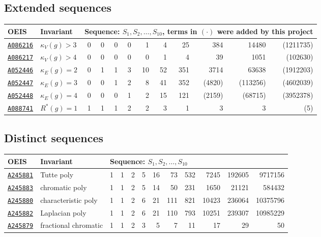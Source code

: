 \documentclass[12pt]{article}
\newcommand{\OEIS}[1]
{\href{https://oeis.org/#1}{\texttt{#1}}}
\newcommand{\SEQ}{S}
\newcommand{\VARedgeconnectivity}{\kappa_{E}(g)}
\newcommand{\VARvertexconnectivity}{\kappa_{V}(g)}
\newcommand{\VARstronglyregular}{R^*}
\begin{document}
\begin{appendices}
\newenvironment{invariantTable}[2]
{
  \begin{longtable}{@{\extracolsep{\fill}} #1}
    \toprule
    OEIS & Invariant & #2 \\
    \midrule\bottomrule
}
{
  \end{longtable}
}

\subsection{Extended sequences}
\label{sec:seq_extended}

\begin{invariantTable}{l l r r r r r r r r r r}
{\multicolumn{10}{l}{Sequence: $\SEQ_1, \SEQ_2, \ldots, \SEQ_{10}$, terms in $(\cdot)$ were added by this project}}
\OEIS{A086216} & $\VARvertexconnectivity > 3$ & 0 & 0 & 0 & 0 & 1 & 4 & 25 & 384 & 14480 & (1211735) \\
\OEIS{A086217} & $\VARvertexconnectivity > 4$ & 0 & 0 & 0 & 0 & 0 & 1 & 4 & 39 & 1051 & (102630) \\
\OEIS{A052446} & $\VARedgeconnectivity =2$ & 	0& 1& 1& 3& 10& 52& 351& 3714& 63638& (1912203) \\
\OEIS{A052447} & $\VARedgeconnectivity =3$ & 0& 0& 1& 2& 8& 41& 352& (4820) & (113256) & (4602039) \\
\OEIS{A052448} & $\VARedgeconnectivity =4$ & 	0& 0& 0& 1& 2& 15& 121& (2159) & (68715) & (3952378) \\
\OEIS{A088741} & $\VARstronglyregular(g)=1$ & 	1& 1& 1& 2& 2& 3& 1& 3& 3& (5) \\
\end{invariantTable}

\clearpage %

\subsection{Distinct sequences}
\label{sec:seq_distinct}

\begin{invariantTable}{l l r r r r r r r r r r}
{\multicolumn{10}{l}{Sequence: $\SEQ_1, \SEQ_2, \ldots, \SEQ_{10}$}}
\OEIS{A245881} & Tutte poly & 1 & 1 & 2 & 5 & 16 & 73 & 532 & 7245 & 192605 & 9717156 \\
\OEIS{A245883} & chromatic poly & 1 & 1 & 2 & 5 & 14 & 50 & 231 & 1650 & 21121 & 584432 \\
\OEIS{A245880} & characteristic poly & 1 & 1 & 2 & 6 & 21 & 111 & 821 & 10423 & 236064 & 10375796 \\
\OEIS{A245882} & Laplacian poly & 1 & 1 & 2 & 6 & 21 & 110 & 793 & 10251 & 239307 & 10985229 \\
\OEIS{A245879} & fractional chromatic& 1 & 1 & 2 & 3 & 5 & 7 & 11 & 17 & 29 & 50 \\
\end{invariantTable}


\end{appendices}
\end{document}
